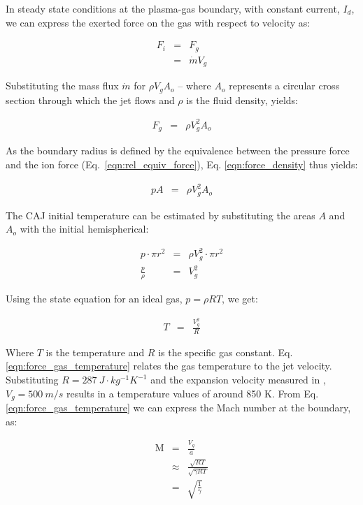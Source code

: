 \documentclass[a4paper]{iacas}%
\begin{document}
In steady state conditions at the plasma-gas boundary, with constant current, $I_d$, we can express the exerted force on the gas with respect to velocity as:

\begin{eqnarray}\label{eqn:force_mass_flux}
	F_i & =& F_g\\
	 &=& \dot{m} V_g
\end{eqnarray}

Substituting the mass flux $\dot{m}$ for $\rho V_g A_{o}$ -- where $A_{o}$ represents a circular cross section through which the jet flows and $\rho$ is the fluid density, yields:

\begin{eqnarray}\label{eqn:force_density}
F_g &=& \rho V^2_g A_{o}
\end{eqnarray}

\noindent As the boundary radius is defined by the equivalence between the pressure force and the ion force (Eq.~\eqref{eqn:rel_equiv_force}), 
Eq. \eqref{eqn:force_density} thus yields:

\begin{eqnarray}\label{eqn:force_gas_equal}
p A &=& \rho V^2_g A_{o}
\end{eqnarray}

The CAJ initial temperature can be estimated by substituting the areas $A$ and $A_o$ with the initial hemispherical: 

\begin{eqnarray}\label{eqn:force_gas_ratio}
p \cdot \pi r^2 &=& \rho V^2_g \cdot \pi r^2 \\
\frac{p}{\rho} &=& V^2_g
\end{eqnarray}

\noindent Using the state equation for an ideal gas, $p = \rho RT$, we get:

\begin{eqnarray}\label{eqn:force_gas_temperature}
	T &=& \frac{V^2_g}{R}
\end{eqnarray}

Where $T$ is the temperature and $R$ is the specific gas constant. Eq. \eqref{eqn:force_gas_temperature} relates the gas temperature to the jet velocity. Substituting $R = 287~J\cdot kg^{-1} K^{-1}$ and the expansion velocity measured in \cite{KRClose}, $V_g = 500~m/s$ results in a temperature values of around 850 K. From Eq. \eqref{eqn:force_gas_temperature} we can express the Mach number at the boundary, as:

\begin{eqnarray}
	\mathrm{M} &=& \frac{V_g}{a} \\
	 &\approx& \frac{\sqrt{RT}}{\sqrt{\gamma R T}}\\\label{eqn:mach}
	 &=& \sqrt{\frac{1}{\gamma}}
\end{eqnarray}
\end{document}
